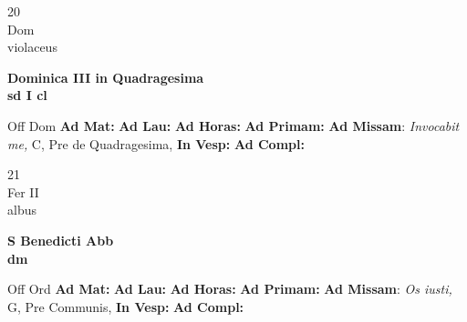 \documentclass[10pt, openany]{book}
\begin{document}
        \begin{center}
            \begin{minipage}{3.5in}
                \vspace{2em}
                \begin{minipage}{0.5in}
                    {\Huge 20} \\
                    {\normalsize Dom} \\
                    {\normalsize violaceus}
                \end{minipage}
                \begin{minipage}{3.0in}
                    \textbf{ \large Dominica III in Quadragesima \\
                    \textnormal{\normalsize sd I cl}} \\ 
                \end{minipage}
                \begin{justify}Off Dom
                    \textbf{Ad Mat: }
                    \textbf{Ad Lau: }
                    \textbf{Ad Horas: }
                    \textbf{Ad Primam: }\textbf{Ad Missam}: \textit{Invocabit me,} C, Pre de Quadragesima,  
                    \textbf{In Vesp: }
                    \textbf{Ad Compl: }
                \end{justify}
            \end{minipage}
        \end{center}
    
        \begin{center}
            \begin{minipage}{3.5in}
                \vspace{2em}
                \begin{minipage}{0.5in}
                    {\Huge 21} \\
                    {\normalsize Fer II} \\
                    {\normalsize albus}
                \end{minipage}
                \begin{minipage}{3.0in}
                    \textbf{ \large S Benedicti Abb \\
                    \textnormal{\normalsize dm}} \\ 
                \end{minipage}
                \begin{justify}Off Ord
                    \textbf{Ad Mat: }
                    \textbf{Ad Lau: }
                    \textbf{Ad Horas: }
                    \textbf{Ad Primam: }\textbf{Ad Missam}: \textit{Os iusti,} G, Pre Communis,  
                    \textbf{In Vesp: }
                    \textbf{Ad Compl: }
                \end{justify}
            \end{minipage}
        \end{center}
    
\end{document}
